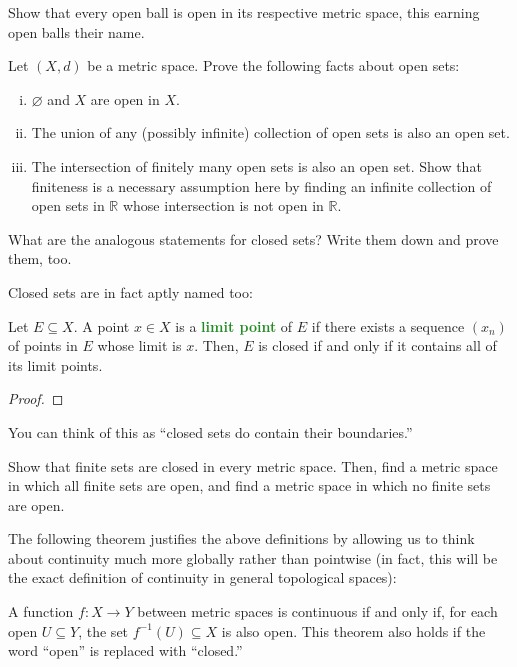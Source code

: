 \documentclass[10pt]{scrartcl}
\providecommand{\RR}{\mathbb R}
\providecommand{\ii}{\item}
\providecommand{\inv}{^{-1}}
\providecommand{\vocab}[1]{{\textbf{\textcolor{ForestGreen}{#1}}}}
\begin{document}
\begin{exercise}
	Show that every open ball is open in its respective metric space,
	this earning open balls their name.
\end{exercise}

\begin{exercise}
	Let $(X, d)$ be a metric space.
	Prove the following facts about open sets:
	\begin{enumerate}[(i)]
		\ii $\varnothing$ and $X$ are open in $X$.
		\ii The union of any (possibly infinite) collection
		of open sets is also an open set.
		\ii The intersection of finitely many open sets is also an open set.
		Show that finiteness is a necessary assumption here
		by finding an infinite collection of open sets in $\RR$
		whose intersection is not open in $\RR$.
	\end{enumerate}
	What are the analogous statements for closed sets?
	Write them down and prove them, too.
\end{exercise}

Closed sets are in fact aptly named too:
\begin{theorem}
	\label{wk7:def:closed-iff-contains-limitpts}
	Let $E\subseteq X$.
	A point $x\in X$ is a \vocab{limit point} of $E$
	if there exists a sequence $(x_n)$ of points in $E$
	whose limit is $x$.
	Then, $E$ is closed if and only if
	it contains all of its limit points. 
\end{theorem}

\begin{proof}
\end{proof}

You can think of this as ``closed sets do contain their boundaries.''
\begin{exercise}
	Show that finite sets are closed in every metric space.
	Then, find a metric space in which all finite sets are open,
	and find a metric space in which no finite sets are open.
\end{exercise}

The following theorem justifies the above definitions
by allowing us to think about continuity much more globally
rather than pointwise
(in fact, this will be the exact definition of continuity
in general topological spaces):
\begin{theorem}
	A function $f\colon X\to Y$ between metric spaces
	is continuous if and only if, for each open $U\subseteq Y$,
	the set $f\inv(U)\subseteq X$ is also open.
	This theorem also holds if the word ``open'' is replaced with ``closed.''
\end{theorem}
\end{document}

